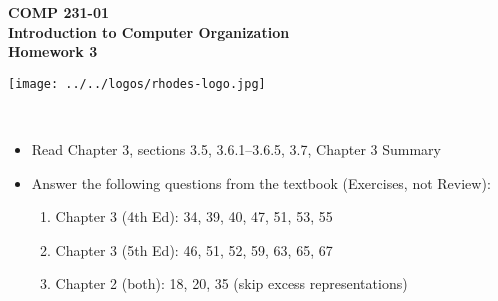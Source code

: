 \documentclass[10pt]{article}
\begin{document}

\hspace{-5mm}
\begin{minipage}{0.65\linewidth}
  \textbf{
      \hspace{-3mm}
      {\Large COMP 231-01}\\
      {\Large Introduction to Computer Organization}\\
      {\Large Homework 3}}
\end{minipage}
\begin{minipage}{0.35\linewidth}
  \texttt{[image: ../../logos/rhodes-logo.jpg]}
\end{minipage}

\\


\begin{itemize}

\setlength\itemsep{10mm}

\item Read Chapter 3, sections 3.5, 3.6.1--3.6.5, 3.7, Chapter 3 Summary

\item Answer the following questions from the textbook (Exercises, not
  Review):

\begin{enumerate}
\setlength\itemsep{5mm}
\item Chapter 3 (4th Ed): 34, 39, 40, 47, 51, 53, 55
\item Chapter 3 (5th Ed): 46, 51, 52, 59, 63, 65, 67
\item Chapter 2 (both): 18, 20, 35 (skip excess representations)

\end{enumerate}

\end{itemize}
\end{document}
